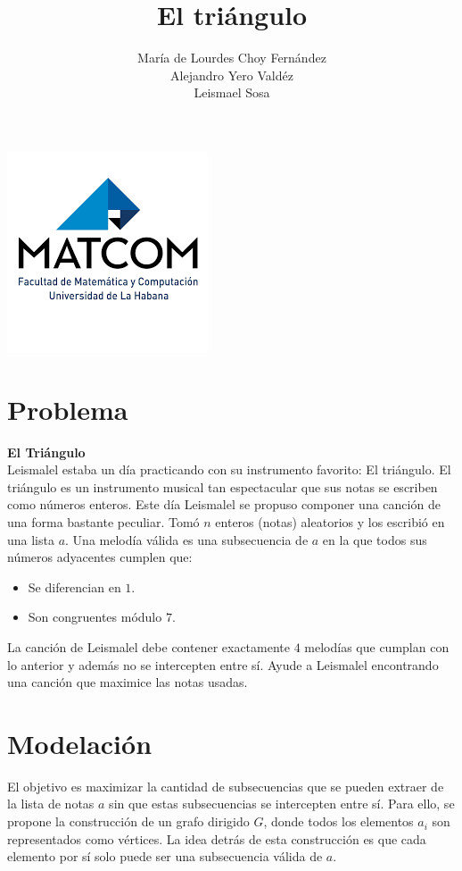 \documentclass{article}
\title{\bf{El tri\'{a}ngulo}}
\date{}
\author{María de Lourdes Choy Fernández \\ Alejandro Yero Valdéz \\ Leismael Sosa}
\begin{document}
\pagestyle{empty}
\maketitle
\thispagestyle{empty}
\begin{center}
\includegraphics[scale=1]{images}
\end{center}
\newpage

\tableofcontents

\newpage
\setcounter{page}{1}
\pagestyle{plain}

\section{Problema}
\textbf{El Triángulo} \\
Leismalel estaba un día practicando con su instrumento favorito: El triángulo. El  
triángulo es un instrumento musical tan espectacular que sus notas se escriben  
como números enteros. Este día Leismalel se propuso componer una canción de  
una forma bastante peculiar. Tomó $n$ enteros (notas) aleatorios y los escribió  
en una lista $a$. Una melodía válida es una subsecuencia de $a$ en la que todos sus  
números adyacentes cumplen que:  
\begin{itemize}
    \item Se diferencian en $1$.  
    \item Son congruentes módulo $7$.  
\end{itemize}
La canción de Leismalel debe contener exactamente $4$ melodías que cumplan con  
lo anterior y además no se intercepten entre sí. Ayude a Leismalel encontrando una  
canción que maximice las notas usadas.
\section{Modelación}

El objetivo es maximizar la cantidad de subsecuencias que se pueden extraer de la lista de notas $a$ sin que estas subsecuencias se intercepten entre sí. Para ello, se propone la construcción de un grafo dirigido $G$, donde todos los elementos $a_i$ son representados como vértices. La idea detrás de esta construcción es que cada elemento por sí solo puede ser una subsecuencia válida de $a$.
\end{document}

